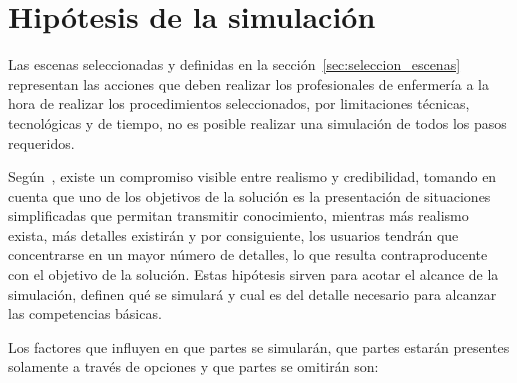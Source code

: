 \section{Hipótesis de la simulación}
\label{sec:hipotesis}


Las escenas seleccionadas y definidas en la sección~\ref{sec:seleccion_escenas}
representan las acciones que deben realizar los profesionales de enfermería a la
hora de realizar los procedimientos seleccionados, por limitaciones técnicas,
tecnológicas y de tiempo, no es posible realizar una simulación de todos los
pasos requeridos.


Según~\cite{videojuegos:gonzaleztardon}, existe un compromiso visible entre
realismo y credibilidad, tomando en cuenta que uno de los objetivos de la
solución es la presentación de situaciones simplificadas que permitan transmitir
conocimiento, mientras más realismo exista, más detalles existirán y por
consiguiente, los usuarios tendrán que concentrarse en un mayor número de
detalles, lo que resulta contraproducente con el objetivo de la
solución\cite{videojuegos:gonzaleztardon}. Estas hipótesis sirven para acotar el
alcance de la simulación, definen qué se simulará y cual es del detalle
necesario para alcanzar las competencias básicas.

Los factores que influyen en que partes se simularán, que partes estarán
presentes solamente a través de opciones y que partes se omitirán son:

